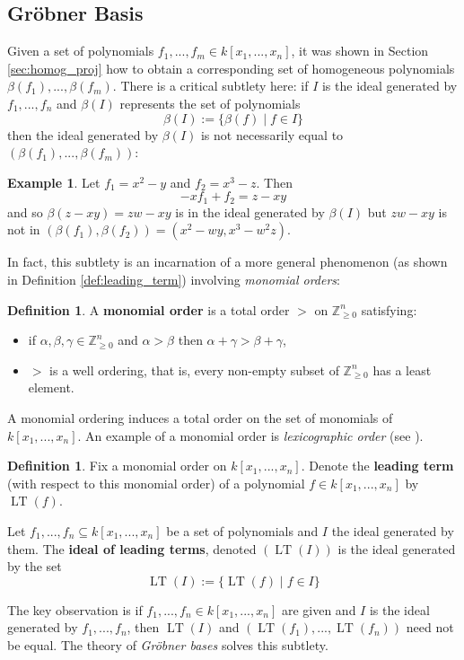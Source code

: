 \documentclass[12pt]{article}
\theoremstyle{plain}
\theoremstyle{definition}
\newtheorem{defn}[thm]{Definition} %
\newtheorem{example}[thm]{Example}
\newcommand{\bb}[1]{\mathbb{#1}}
\begin{document}
\subsection{Gr\"{o}bner Basis}
Given a set of polynomials $f_1,...,f_m \in k[x_1,...,x_n]$, it was shown in Section \ref{sec:homog_proj} how to obtain a corresponding set of homogeneous polynomials $\beta(f_1),...,\beta(f_m)$. There is a critical subtlety here: if $I$ is the ideal generated by $f_1,...,f_n$ and $\beta(I)$ represents the set of polynomials
\begin{equation}\label{eq:beta_I}
    \beta(I) := \lbrace \beta(f) \mid f \in I\rbrace
\end{equation}
then the ideal generated by $\beta(I)$ is not necessarily equal to $(\beta(f_1),...,\beta(f_m))$:
\begin{example}\label{ex:beta_induced}
Let $f_1 = x^2 - y$ and $f_2 = x^3 - z$. Then
\begin{equation}
    -x f_1 + f_2 = z - xy
\end{equation}
and so $\beta(z - xy) = zw - xy$ is in the ideal generated by $\beta(I)$ but $zw - xy$ is not in $(\beta(f_1),\beta(f_2)) = (x^2 - wy, x^3 - w^2z)$.
\end{example}
In fact, this subtlety is an incarnation of a more general phenomenon (as shown in Definition \ref{def:leading_term}) involving \emph{monomial orders}:
\begin{defn}
A \textbf{monomial order} is a total order $>$ on $\bb{Z}_{\geq 0}^n$ satisfying:
\begin{itemize}
    \item if $\alpha, \beta, \gamma \in \bb{Z}_{\geq 0}^n$ and $\alpha > \beta$ then $\alpha + \gamma > \beta + \gamma$,
    \item $>$ is a well ordering, that is, every non-empty subset of $\bb{Z}_{\geq 0}^n$ has a least element.
\end{itemize}
\end{defn}\label{def:leading_term}
A monomial ordering induces a total order on the set of monomials of $k[x_1,...,x_n]$. An example of a monomial order is \emph{lexicographic order} (see \cite[\S 2]{grobner}).
\begin{defn}
Fix a monomial order on $k[x_1,...,x_n]$. Denote the \textbf{leading term} (with respect to this monomial order) of a polynomial $f \in k[x_1,...,x_n]$ by $\operatorname{LT}(f)$.

Let $f_1,...,f_n \subseteq k[x_1,...,x_n]$ be a set of polynomials and $I$ the ideal generated by them. The \textbf{ideal of leading terms}, denoted $(\operatorname{LT}(I))$ is the ideal generated by the set
\begin{equation}
    \operatorname{LT}(I) := \lbrace \operatorname{LT}(f) \mid f \in I\rbrace
\end{equation}
\end{defn}
The key observation is if $f_1,...,f_n  \in k[x_1,...,x_n]$ are given and $I$ is the ideal generated by $f_1,...,f_n$, then $\operatorname{LT}(I)$ and $(\operatorname{LT}(f_1),...,\operatorname{LT}(f_n))$ need not be equal. The theory of \emph{Gr\"{o}bner bases} solves this subtlety.
\end{document}
